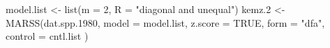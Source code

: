 \begin{Schunk}
\begin{Sinput}
 model.list <- list(m = 2, R = "diagonal and unequal")
 kemz.2 <- MARSS(dat.spp.1980,
   model = model.list,
   z.score = TRUE, form = "dfa", control = cntl.list
 )
\end{Sinput}
\end{Schunk}
